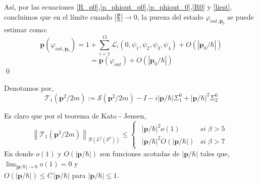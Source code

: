 \documentclass[12pt]{book}
\numberwithin{equation}{chapter}
\def\n{\noindent}
\def\S{\mathcal{S}}
\def\T{\mathcal{T}}
\def\B{\mathcal{B}}
\def\L{\mathcal{L}}
\def\vp{\varphi}
\def\P{\mathbf{p}}
\begin{document}
As\'i, por las ecuaciones \eqref{R_p0},\eqref{p_phiout_p0},\eqref{p_phiout_0},\eqref{R0} y \eqref{liest}, concluimos que en el l\'imite cuando $\left| \frac{\P}{\hbar} \right| \rightarrow 0$, la pureza del estado $\vp_{out,\P_{0}}$ se puede estimar como:
$$\P (\vp_{out,\P_{0}})=
1+\sum_{i=1}^{15} \L_{i}(0, \psi_{1},\psi_{2},\psi_{3},\psi_{4})+ O(|\P_{0}/\hbar|) $$
\begin{equation}
= \P (\vp_{out})+O(|\P_{0}/\hbar|)
\end{equation}
\qed
\vspace{3 mm}

\n Denotamos por,
\begin{equation}\label{tao1}
\T_{1}( \P^{2}/2m ) := \S ( \P^{2}/2m ) - I -i |\P/\hbar| \Sigma_{1}^{0} + |\P/\hbar|^{2} \Sigma_{2}^{0}
\end{equation}

\n Es claro que por el teorema de Kato - Jensen,
\begin{equation}\label{tao1nor}
\left\| \T_{1}( \P^{2}/2m )  \right\|_{\B(L^{2}(\S^{2}))} \leq \begin{cases} \begin{matrix} |\P/\hbar|^{2} o(1) & si\; \beta >5 \\ |\P/\hbar|^{2} O(|\P/\hbar|) & si\; \beta > 7 \end{matrix} \end{cases}
\end{equation}
En donde $o(1)$ y $O(|\P/\hbar|)$ son funciones acotadas de $|\P/\hbar|$ tales que, $\lim_{|\P/\hbar| \rightarrow 0} o(1)=0$ y \\
$ O(|\P/\hbar|) \leq C \, |\P/\hbar|  $ para $|\P/\hbar| \leq 1 $.
\end{document}
